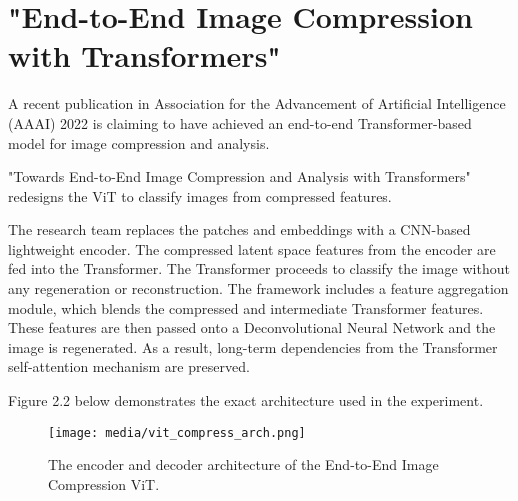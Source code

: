 





\newpage
\section{"End-to-End Image Compression with Transformers"}

A recent publication in Association for the Advancement of Artificial Intelligence (AAAI) 2022 is
claiming to have achieved an end-to-end Transformer-based model for image compression and analysis.

"Towards End-to-End Image Compression and Analysis with Transformers" redesigns the ViT
to classify images from compressed features. \citep{Bai2022AAAI}

The research team replaces the patches and embeddings with a CNN-based lightweight encoder. 
The compressed latent space features from the encoder are fed into the Transformer.
The Transformer proceeds to classify the image without any regeneration or reconstruction. 
The framework includes a feature aggregation module, which blends the compressed and intermediate Transformer features. 
These features are then passed onto a Deconvolutional Neural Network 
and the image is regenerated. As a result, long-term dependencies from the Transformer self-attention mechanism 
are preserved.

Figure 2.2 below demonstrates the exact architecture used in the experiment.

\begin{figure}[H]
	\begin{center}
	\texttt{[image: media/vit\_compress\_arch.png]}
	\end{center}
	\caption[End-to-End Image Compression ViT]{The encoder and decoder architecture of the  
    End-to-End Image Compression ViT. \citep{Bai2022AAAI}}
	\end{figure}

